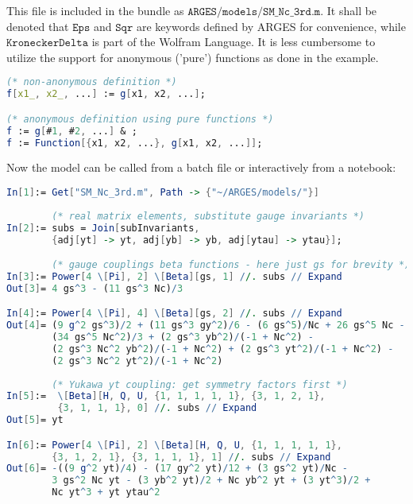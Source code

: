 \documentclass{scrartcl}
\begin{document}
This file is included in the bundle as $\mathtt{ARGES/models/SM\_Nc\_3rd.m}$. It shall be denoted that $\mathtt{Eps}$ and $\mathtt{Sqr}$ are keywords defined by ARGES for convenience, while $\mathtt{KroneckerDelta}$ is part of the Wolfram Language. It is less cumbersome to utilize the support for anonymous ('pure') functions as done in the example.
\begin{lstlisting}[language=mathematica,mathescape,columns=flexible,backgroundcolor=\color{light-gray}]
(* non-anonymous definition *)
f[x1_, x2_, ...] := g[x1, x2, ...];

(* anonymous definition using pure functions *)
f := g[#1, #2, ...] & ;
f := Function[{x1, x2, ...}, g[x1, x2, ...]]; 
\end{lstlisting}
Now the model can be called from a batch file or interactively from a notebook:
\begin{lstlisting}[language=mathematica,mathescape,columns=flexible,backgroundcolor=\color{light-gray}]
In[1]:= Get["SM_Nc_3rd.m", Path -> {"~/ARGES/models/"}]
        
        (* real matrix elements, substitute gauge invariants *)        
In[2]:= subs = Join[subInvariants, 
        {adj[yt] -> yt, adj[yb] -> yb, adj[ytau] -> ytau}];

        (* gauge couplings beta functions - here just gs for brevity *)        
In[3]:= Power[4 \[Pi], 2] \[Beta][gs, 1] //. subs // Expand
Out[3]= 4 gs^3 - (11 gs^3 Nc)/3

In[4]:= Power[4 \[Pi], 4] \[Beta][gs, 2] //. subs // Expand
Out[4]= (9 g^2 gs^3)/2 + (11 gs^3 gy^2)/6 - (6 gs^5)/Nc + 26 gs^5 Nc - 
        (34 gs^5 Nc^2)/3 + (2 gs^3 yb^2)/(-1 + Nc^2) - 
        (2 gs^3 Nc^2 yb^2)/(-1 + Nc^2) + (2 gs^3 yt^2)/(-1 + Nc^2) - 
        (2 gs^3 Nc^2 yt^2)/(-1 + Nc^2)
        
        (* Yukawa yt coupling: get symmetry factors first *)
In[5]:=  \[Beta][H, Q, U, {1, 1, 1, 1, 1}, {3, 1, 2, 1}, 
         {3, 1, 1, 1}, 0] //. subs // Expand
Out[5]= yt

In[6]:= Power[4 \[Pi], 2] \[Beta][H, Q, U, {1, 1, 1, 1, 1}, 
        {3, 1, 2, 1}, {3, 1, 1, 1}, 1] //. subs // Expand
Out[6]= -((9 g^2 yt)/4) - (17 gy^2 yt)/12 + (3 gs^2 yt)/Nc - 
        3 gs^2 Nc yt - (3 yb^2 yt)/2 + Nc yb^2 yt + (3 yt^3)/2 + 
        Nc yt^3 + yt ytau^2
        

\end{lstlisting}
\end{document}
